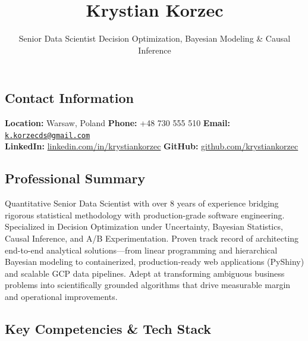 \documentclass[
  9pt,
  letterpaper,
  DIV=11,
  numbers=noendperiod]{scrartcl}
\title{Krystian Korzec}
\subtitle{Senior Data Scientist \textbar{} Decision Optimization,
Bayesian Modeling \& Causal Inference}
\author{}
\date{}
\begin{document}
\maketitle
\ifdefined\Shaded\renewenvironment{Shaded}{\begin{tcolorbox}[boxrule=0pt, sharp corners, frame hidden, interior hidden, borderline west={3pt}{0pt}{shadecolor}, enhanced, breakable]}{\end{tcolorbox}}\fi

\hypertarget{contact-information}{%
\subsection{Contact Information}\label{contact-information}}

\textbf{Location:} Warsaw, Poland \textbar{} \textbf{Phone:} +48 730 555
510 \textbar{} \textbf{Email:}
\href{mailto:k.korzecds@gmail.com}{\nolinkurl{k.korzecds@gmail.com}}\\
\textbf{LinkedIn:}
\href{https://www.linkedin.com/in/krystiankorzec/}{linkedin.com/in/krystiankorzec}
\textbar{} \textbf{GitHub:}
\href{https://github.com/krystiankorzec}{github.com/krystiankorzec}

\hypertarget{professional-summary}{%
\subsection{Professional Summary}\label{professional-summary}}

Quantitative Senior Data Scientist with over 8 years of experience
bridging rigorous statistical methodology with production-grade software
engineering. Specialized in Decision Optimization under Uncertainty,
Bayesian Statistics, Causal Inference, and A/B Experimentation. Proven
track record of architecting end-to-end analytical solutions---from
linear programming and hierarchical Bayesian modeling to containerized,
production-ready web applications (PyShiny) and scalable GCP data
pipelines. Adept at transforming ambiguous business problems into
scientifically grounded algorithms that drive measurable margin and
operational improvements.

\hypertarget{key-competencies-tech-stack}{%
\subsection{Key Competencies \& Tech
Stack}\label{key-competencies-tech-stack}}
\end{document}
